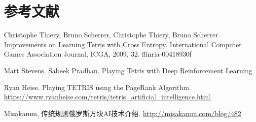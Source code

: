 \documentclass[10pt,UTF8]{article}
\begin{document}
\section*{参考文献}

\begin{enumerate}[label={[\arabic*]}]
    \item Christophe Thiery, Bruno Scherrer, Christophe Thiery, Bruno Scherrer. Improvements on Learning Tetris with Cross Entropy. International Computer Games Association Journal, ICGA, 2009, 32. ffinria-00418930f
    \item Matt Stevens, Sabeek Pradhan. Playing Tetris with Deep Reinforcement Learning
    \item Ryan Heise. Playing TETRIS using the PageRank Algorithm. \url{https://www.ryanheise.com/tetris/tetris_artificial_intelligence.html}
    \item Misakamm, 传统规则俄罗斯方块AI技术介绍. \url{http://misakamm.com/blog/482}
\end{enumerate}
\end{document}
